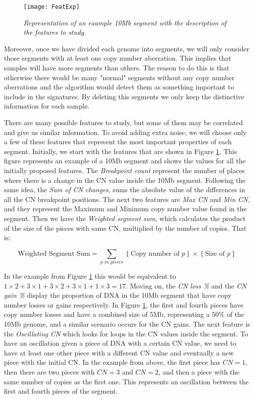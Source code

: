 \documentclass[a4paper]{article}
\begin{document}
\begin{figure}[h] 
	\centering
	\texttt{[image: FeatExp]} 
	\caption{\textit{Representation of an example 10Mb segment with the description of the features to study.}} \label{FeatExp}
\end{figure}

Moreover, once we have divided each genome into segments, we will only consider those segments with at least one copy number aberration. This implies that samples will have more segments than others. The reason to do this is that otherwise there would be many "normal" segments without any copy number aberrations and the algorithm would detect them as something important to include in the signatures. By deleting this segments we only keep the distinctive information for each sample.

There are many possible features to study, but some of them may be correlated and give us similar information. To avoid adding extra noise, we will choose only a few of these features that represent the most important properties of each segment. Initially, we start with the features that are shown in Figure \ref{FeatExp}. This figure represents an example of a 10Mb segment and shows the values for all the initially proposed features. The \textit{Breakpoint count} represent the number of places where there is a change in the CN value inside the 10Mb segment. Following the same idea, the \textit{Sum of CN changes}, sums the absolute value of the differences in all the CN breakpoint positions. The next two features are \textit{Max CN} and \textit{Min CN}, and they represent the Maximum and Minimum copy number value found in the segment. Then we have the \textit{Weighted segment sum}, which calculates the product of the size of the pieces with same CN, multiplied by the number of copies. That is:

\begin{equation*}
\text{Weighted Segment Sum}=\sum_{p \textit{ in pieces}} \left\{\text{Copy number of } \textit{p} \right\} \times \left\{\text{Size of } \textit{p} \right\}
\end{equation*}

In the example from Figure \ref{FeatExp} this would be equivalent to $1\times 2 +3\times 1 +3\times 2+3\times 1  + 1 \times 3  = 17 $. Moving on, the \textit{CN loss \%} and the \textit{CN gain \%} display the proportion of DNA in the 10Mb segment that have copy number losses or gains respectively. In Figure \ref{FeatExp}, the first and fourth pieces have copy number losses and have a combined size of 5Mb, representing a 50\% of the 10Mb genome, and a similar scenario occurs for the CN gains. The next feature is the \textit{Oscillating CN} which looks for loops in the CN values inside the segment. To have an oscillation given a piece of DNA with a certain CN value, we need to have at least one other piece with a different CN value and eventually a new piece with the initial CN. In the example from above, the first piece has $CN=1$, then there are two pieces with $CN=3$ and $CN=2$, and then a piece with the same number of copies as the first one. This represents an oscillation between the first and fourth pieces of the segment. 
\end{document}
